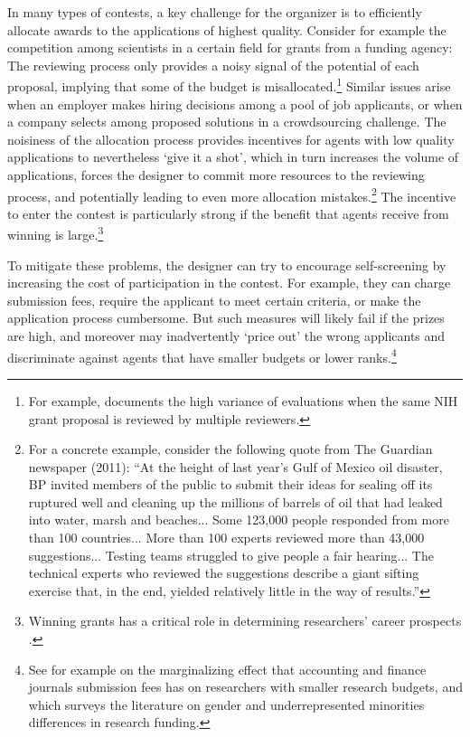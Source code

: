 \documentclass[12pt]{article}
\theoremstyle{plain}
\theoremstyle{definition}
\theoremstyle{remark}
\begin{document}
In many types of contests, a key challenge for the organizer is to efficiently allocate awards to the applications of highest quality. Consider for example the competition among scientists in a certain field for grants from a funding agency: The reviewing process only provides a noisy signal of the potential of each proposal, implying that some of the budget is misallocated.\footnote{For example, \citet{pier2018low} documents the high variance of evaluations when the same NIH grant proposal is reviewed by multiple reviewers.} Similar issues arise when an employer makes hiring decisions among a pool of job applicants, or when a company selects among proposed solutions in a crowdsourcing challenge. The noisiness of the allocation process provides incentives for agents with low quality applications to nevertheless `give it a shot', which in turn increases the volume of applications, forces the designer to commit more resources to the reviewing process, and potentially leading to even more allocation mistakes.\footnote{For a concrete example, consider the following quote from The Guardian newspaper (2011): ``At the height of last year's Gulf of Mexico oil disaster, BP invited members of the public to submit their ideas for sealing off its ruptured well and cleaning up the millions of barrels of oil that had leaked into water, marsh and beaches... Some 123,000 people responded from more than 100 countries... More than 100 experts reviewed more than 43,000 suggestions... Testing teams struggled to give people a fair hearing... The technical experts who reviewed the suggestions describe a giant sifting exercise that, in the end, yielded relatively little in the way of results.''} The incentive to enter the contest is particularly strong if the benefit that agents receive from winning is large.\footnote{Winning grants has a critical role in determining researchers' career prospects \citep{melkers202318}.} 

To mitigate these problems, the designer can try to encourage self-screening by increasing the cost of participation in the contest. For example, they can charge submission fees, require the applicant to meet certain criteria, or make the application process cumbersome. But such measures will likely fail if the prizes are high, and moreover may inadvertently `price out' the wrong applicants and discriminate against agents that have smaller budgets or lower ranks.\footnote{See for example \citet{oldford2023marginalizing} on the marginalizing effect that accounting and finance journals submission fees has on researchers with smaller research budgets, and \citet{cruz202317} which surveys the literature on gender and underrepresented minorities differences in research funding.}
\end{document}
